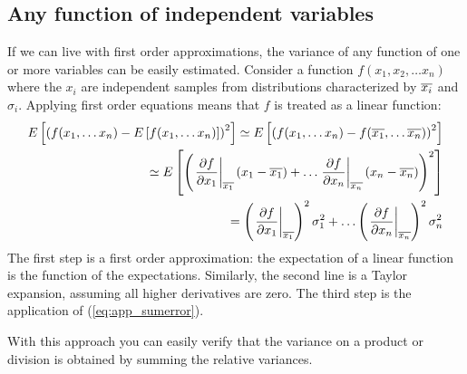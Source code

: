 \subsection{Any function of independent variables}
If we can live with first order approximations, the variance of any function
of one or more variables can be easily estimated. Consider a function
$f(x_1, x_2, \ldots x_n)$ where the $x_i$ are independent samples from
distributions characterized by $\overline{x_i}$ and $\sigma_i$. Applying first order
equations means that $f$ is treated as a linear function:
\begin{eqnarray}
  E\left[{\left( f(x_1, \ldots x_n) - E\left[{f(x_1, \ldots x_n)}\right]\right)^2}\right]
  \simeq  E\left[{\left( f(x_1,\ldots x_n) 
        - f(\overline{x_1}, \ldots \overline{x_n})\right)^2}\right] \nonumber \\
  \simeq  E\left[{\left( \left. \frac{\partial f}{\partial x_1} \right|_{\overline{x_1}}
                 (x_1 - \overline{x_1}) + \ldots
            \left. \frac{\partial f}{\partial x_n} \right|_{\overline{x_n}}
                 (x_n - \overline{x_n}) \right)^2}\right] \nonumber \\
  = \left( \left. \frac{\partial f}{\partial x_1} \right|_{\overline{x_1}} \right)^2
        \sigma_1^2 + \ldots
    \left( \left. \frac{\partial f}{\partial x_n} \right|_{\overline{x_n}} \right)^2
         \sigma_n^2
\end{eqnarray}
The first step is a first order approximation: the expectation of a linear
function is the function of the expectations. Similarly, the second line is a
Taylor expansion, assuming all higher derivatives are zero. The third step is
the application of (\ref{eq:app_sumerror}).

With this approach you can easily verify that the variance on a product or
division is obtained by summing the relative variances.

\newpage
